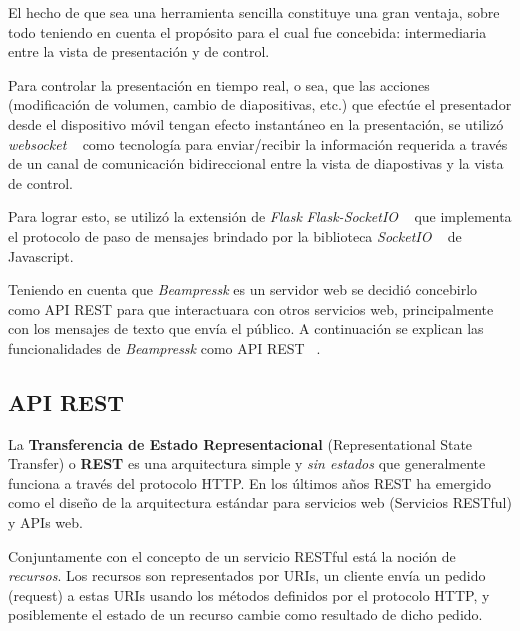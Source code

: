 		El hecho de que sea una herramienta sencilla constituye una gran ventaja, sobre todo teniendo en cuenta el propósito para el cual fue concebida: intermediaria entre la vista de presentación y de control.

		Para controlar la presentación en tiempo real, o sea, que las acciones (modificación de volumen, cambio de diapositivas, etc.) que efectúe el presentador desde el dispositivo móvil tengan efecto instantáneo en la presentación, se utilizó \textit{websocket} ~\cite{websocket} como tecnología para enviar/recibir la información requerida a través de un canal de comunicación bidireccional entre la vista de diapostivas y la vista de control.

		Para lograr esto, se utilizó la extensión de \textit{Flask} \textit{Flask-SocketIO} ~\cite{flasksocket} que implementa el protocolo de paso de mensajes brindado por la biblioteca \textit{SocketIO} ~\cite{socketio} de Javascript.

	 	Teniendo en cuenta que \textit{Beampressk} es un servidor web se decidió concebirlo como API REST para que interactuara con otros servicios web, principalmente con los mensajes de texto que envía el público. A continuación se explican las funcionalidades de \textit{Beampressk} como API REST ~\cite{book:899251}.
		

		\subsection{API REST} %
		\label{sub:api_rest}


			La \textbf{Transferencia de Estado Representacional} (Representational State Transfer) o \textbf{REST} es una arquitectura simple y \textit{sin estados} que generalmente funciona a través del protocolo HTTP. En los últimos años REST ha emergido como el diseño de la arquitectura estándar para servicios web (Servicios RESTful) y APIs web.

			Conjuntamente con el concepto de un servicio RESTful está la noción de \textit{recursos}. Los recursos son representados por URIs, un cliente envía un pedido (request) a estas URIs usando los métodos definidos por el protocolo HTTP, y posiblemente el estado de un recurso cambie como resultado de dicho pedido. 

